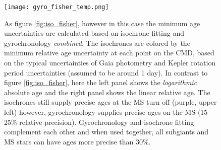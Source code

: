 \begin{figure}
  \caption{
    As figure \ref{fig:iso_fisher}, however in this case the minimum age
    uncertainties are calculated based on isochrone fitting and gyrochronology
    {\it combined}.
    The isochrones are colored by the minimum relative age uncertainty at each
    point on the CMD, based on the typical uncertainties of Gaia photometry
    and Kepler rotation period uncertainties (assumed to be around 1 day).
    In contrast to figure \ref{fig:iso_fisher}, here the left panel shows the
    {\it logarithmic} absolute age and the right panel shows the linear
    relative age.
    The isochrones still supply precise ages at the MS turn off (purple, upper
    left) however, gyrochronology supplies precise ages on the MS (15 - 25\%
    relative precision).
    Gyrochronology and isochrone fitting complement each other and when used
    together, all subgiants and MS stars can have ages more precise than 30\%.
    \label{fig:fischer_gyro}
}
  \centering
    \texttt{[image: gyro\_fisher\_temp.png]}
\label{fig:gyro_fisher}
\end{figure}
